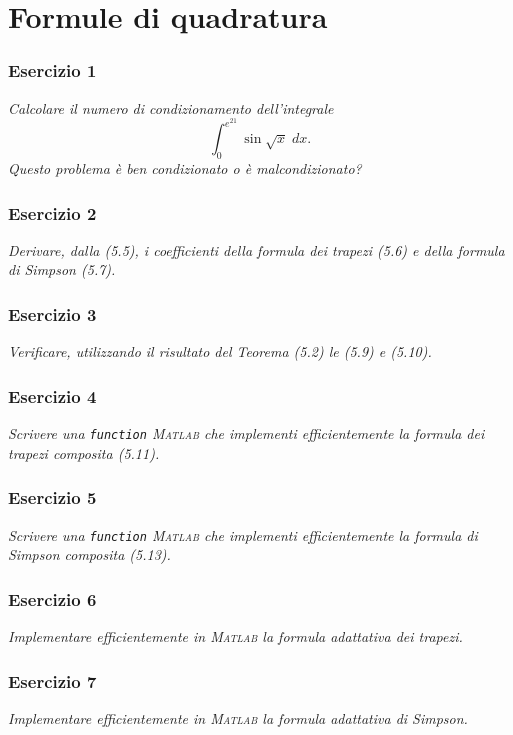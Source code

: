 \chapter{Formule di quadratura}
\label{chap:Cap5}

\subsection{Esercizio 1}
\label{sub:es1}
\emph{Calcolare il numero di condizionamento dell'integrale
$$\int_0^{e^{21}}\sin\sqrt{x}\;dx.$$
Questo problema è ben condizionato o è malcondizionato?}


\subsection{Esercizio 2}
\label{sub:es2}
\emph{Derivare, dalla (5.5), i coefficienti della formula dei trapezi (5.6) e della formula di Simpson (5.7).}

\subsection{Esercizio 3}
\label{sub:es3}
\emph{Verificare, utilizzando il risultato del Teorema (5.2) le (5.9) e (5.10).}

\subsection{Esercizio 4}
\label{sub:es4}
\emph{Scrivere una \lstinline{function} \textsc{Matlab} che implementi efficientemente la formula dei trapezi composita (5.11).}

\subsection{Esercizio 5}
\label{sub:es5}
\emph{Scrivere una \lstinline{function} \textsc{Matlab} che implementi efficientemente la formula di Simpson composita (5.13).}

\subsection{Esercizio 6}
\label{sub:es6}
\emph{Implementare efficientemente in \textsc{Matlab} la formula adattativa dei trapezi.}

\subsection{Esercizio 7}
\label{sub:es7}
\emph{Implementare efficientemente in \textsc{Matlab} la formula adattativa di Simpson.}

